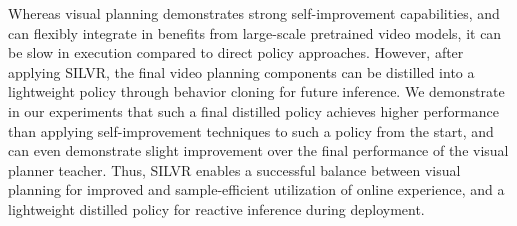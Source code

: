 Whereas visual planning demonstrates strong self-improvement capabilities, and can flexibly integrate in benefits from large-scale pretrained video models, it can be slow in execution compared to direct policy approaches.  However, after applying SILVR, the final video planning components can be distilled into a lightweight policy through behavior cloning for future inference.  We demonstrate in our experiments that such a final distilled policy achieves higher performance than applying self-improvement techniques to such a policy from the start, and can even demonstrate slight improvement over the final performance of the visual planner teacher.  Thus, SILVR enables a successful balance between visual planning for improved and sample-efficient utilization of online experience, and a lightweight distilled policy for reactive inference during deployment.
